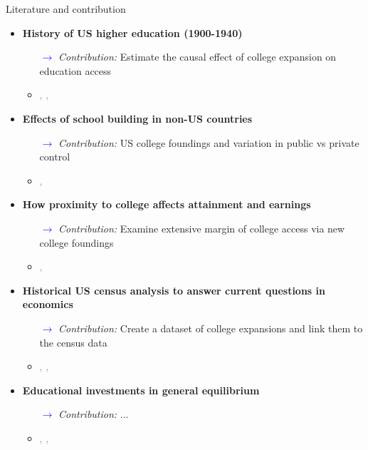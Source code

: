 \documentclass[notes,11pt, aspectratio=169]{beamer}
\begin{document}
\begin{frame}{Literature and contribution}
  \begin{itemize}
    \item \textbf{History of US higher education (1900-1940)}
    \begin{itemize}
      \item[\textcolor{blue}{$\rightarrow$}] \textit{Contribution:} Estimate the causal effect of college expansion on education access
      \item \textcolor{gray}{\cite{goldinAmericasGraduationHigh1998}, \cite{goldinOriginsStateLevelDifferences1998}, \cite{goldinHumanCapitalCenturyAmerican2001}}
    \end{itemize}

    \item \textbf{Effects of school building in non-US countries}
    \begin{itemize}
      \item[\textcolor{blue}{$\rightarrow$}] \textit{Contribution:} US college foundings and variation in public vs private control
      \item \textcolor{gray}{\cite{dufloSchoolingLaborMarket2001}, \cite{nimier-davidLocalHumanCapital2023}}
    \end{itemize}

    \item \textbf{How proximity to college affects attainment and earnings}
    \begin{itemize}
      \item[\textcolor{blue}{$\rightarrow$}] \textit{Contribution:} Examine extensive margin of college access via new college foundings
      \item \textcolor{gray}{\cite{cardUsingGeographicVariation1993}, \cite{actonDistanceDegreesHow2025}}
    \end{itemize}

    \item \textbf{Historical US census analysis to answer current questions in economics}
    \begin{itemize}
      \item[\textcolor{blue}{$\rightarrow$}] \textit{Contribution:} Create a dataset of college expansions and link them to the census data
      \item \textcolor{gray}{\cite{abramitzkyNationImmigrantsAssimilation2014}, \cite{derenoncourtCanYouMove2022}, \cite{bleemerChangesCollegeMobility2025}}
    \end{itemize}
    \item \textbf{Educational investments in general equilibrium}
    \begin{itemize}
      \item[\textcolor{blue}{$\rightarrow$}] \textit{Contribution:} ...
      \item \textcolor{gray}{\cite{khannaLargeScaleEducationReform2023}, \cite{hsiaoEducationalInvestmentSpatial2024}, \cite{eckertGeographyOpportunityEducation2024}}
    \end{itemize}
  \end{itemize}
\end{frame}
\end{document}
